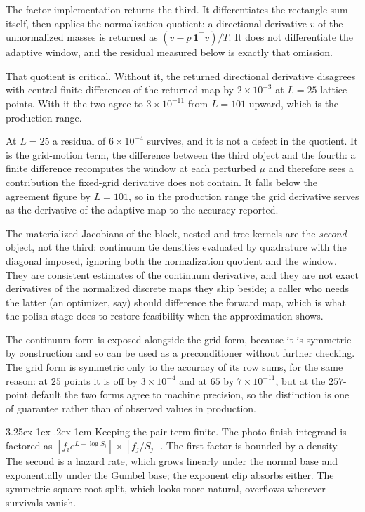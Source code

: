 \documentclass[11pt]{article}
\makeatletter
\renewcommand\paragraph{\@startsection{paragraph}{4}{\z@}%
  {3.25ex \@plus1ex \@minus.2ex}{-1em}%
  {\normalfont\normalsize\itshape}}
\makeatother
\begin{document}
The factor implementation returns the third. It differentiates the rectangle sum
itself, then applies the normalization quotient: a directional derivative
$v$ of the unnormalized masses is returned as
$(v-p\,\mathbf{1}^{\top}v)/T$. It does not differentiate the adaptive
window, and the residual measured below is exactly that omission.

That quotient is critical. Without it, the returned directional
derivative disagrees with central finite differences of the returned map
by $2\times10^{-3}$ at $L=25$ lattice points. With it the two agree to
$3\times10^{-11}$ from $L=101$ upward, which is the production range.

At $L=25$ a residual of $6\times10^{-4}$ survives, and it is not a defect
in the quotient. It is the grid-motion term, the difference between the
third object and the fourth: a finite difference recomputes the window at
each perturbed $\mu$ and therefore sees a contribution the fixed-grid
derivative does not contain. It falls below the agreement figure by
$L=101$, so in the production range the grid derivative serves as the
derivative of the adaptive map to the accuracy reported.

The materialized Jacobians of the block, nested and tree kernels are
the \emph{second} object, not the third: continuum tie densities
evaluated by quadrature with the diagonal imposed, ignoring both the
normalization quotient and the window. They are consistent estimates of
the continuum derivative, and they are not exact derivatives of the
normalized discrete maps they ship beside; a caller who needs the
latter (an optimizer, say) should difference the forward map, which is
what the polish stage does to restore feasibility when the
approximation shows.

The continuum form is exposed alongside the grid form, because it is
symmetric by construction and so can be used as a preconditioner without
further checking. The grid form is symmetric only to the accuracy of its
row sums, for the same reason: at $25$ points it is off by
$3\times10^{-4}$ and at $65$ by $7\times10^{-11}$, but at the $257$-point
default the two forms agree to machine precision, so the distinction is
one of guarantee rather than of observed values in production.

\paragraph{Keeping the pair term finite.} The photo-finish integrand is
factored as $[f_i e^{L-\log S_i}]\times[f_j/S_j]$. The first factor is
bounded by a density. The second is a hazard rate, which grows linearly
under the normal base and exponentially under the Gumbel base; the
exponent clip absorbs either. The symmetric square-root split, which
looks more natural, overflows wherever survivals vanish.
\end{document}
